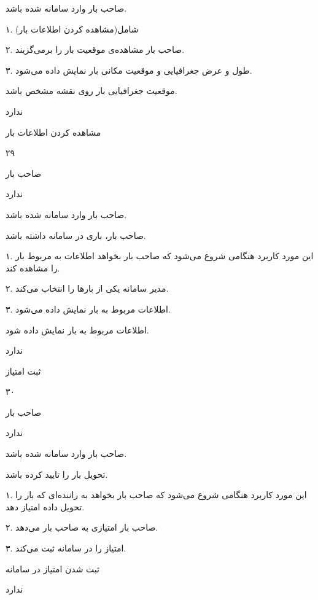 صاحب بار وارد سامانه شده باشد.


۱. شامل(مشاهده کردن اطلاعات بار)

۲. صاحب بار مشاهده‌ی موقعیت بار را برمی‌گزیند.

۳. طول و عرض جغرافیایی و موقعیت مکانی بار نمایش داده می‌شود.

موقعیت جغرافیایی بار روی نقشه مشخص باشد.

ندارد

\newpage

مشاهده کردن اطلاعات بار

۲۹

صاحب بار

ندارد

صاحب بار وارد سامانه شده باشد.

صاحب بار، باری در سامانه داشته باشد.


۱. این مورد کاربرد هنگامی شروع می‌شود که صاحب بار بخواهد اطلاعات به مربوط بار را مشاهده کند.

۲. مدیر سامانه یکی از بارها را انتخاب می‌کند.

۳. اطلاعات مربوط به بار نمایش داده می‌شود.

اطلاعات مربوط به بار نمایش داده شود.

ندارد

\newpage

ثبت امتیاز

۳۰

صاحب بار

ندارد


صاحب بار وارد سامانه شده باشد.

تحویل بار را تایید کرده باشد.


 ۱. این مورد کاربرد هنگامی شروع می‌شود که صاحب بار بخواهد به راننده‌ای که بار را تحویل داده امتیاز دهد.

۲. صاحب بار امتیازی به صاحب بار می‌دهد.

۳. امتیاز را در سامانه ثبت می‌کند.

ثبت شدن امتیاز در سامانه

ندارد
